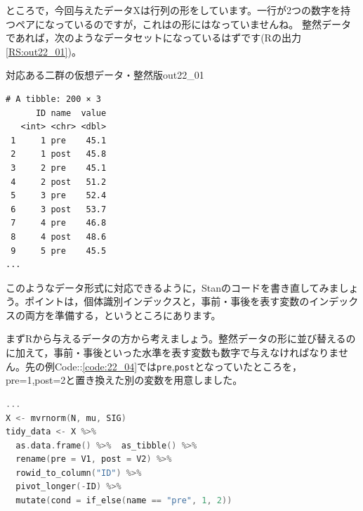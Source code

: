 \documentclass{ltjsbook}
\begin{document}
ところで，今回与えたデータXは行列の形をしています。一行が2つの数字を持つペアになっているのですが，これはの形にはなっていませんね。
整然データであれば，次のようなデータセットになっているはずです(Rの出力\ref{RS:out22_01})。
\begin{Rscreen}{対応ある二群の仮想データ・整然版}{out22_01}
	\begin{verbatim}
# A tibble: 200 × 3
      ID name  value
   <int> <chr> <dbl>
 1     1 pre    45.1
 2     1 post   45.8
 3     2 pre    45.1
 4     2 post   51.2
 5     3 pre    52.4
 6     3 post   53.7
 7     4 pre    46.8
 8     4 post   48.6
 9     5 pre    45.5
...

\end{verbatim}
\end{Rscreen}
このようなデータ形式に対応できるように，Stanのコードを書き直してみましょう。ポイントは，個体識別インデックスと，事前・事後を表す変数のインデックスの両方を準備する，というところにあります。

まずRから与えるデータの方から考えましょう。整然データの形に並び替えるのに加えて，事前・事後といった水準を表す変数も数字で与えなければなりません。先の例Code::\ref{code:22_04}では\verb|pre|,\verb|post|となっていたところを，pre=1,post=2と置き換えた別の変数を用意しました。
\begin{lstlisting}[language=c++,label={code:22_04},caption={対応ある二群の仮想データ・整然版}]
...
X <- mvrnorm(N, mu, SIG)
tidy_data <- X %>%
  as.data.frame() %>%  as_tibble() %>%
  rename(pre = V1, post = V2) %>%
  rowid_to_column("ID") %>%
  pivot_longer(-ID) %>%
  mutate(cond = if_else(name == "pre", 1, 2))
\end{lstlisting}
\end{document}
